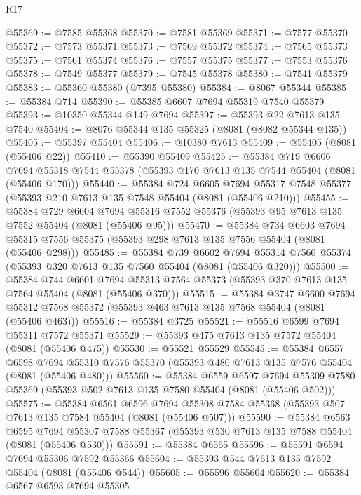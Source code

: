 \begin{lexlean}{R17}
\begin{coremodule}
@55369 := @7585 @55368
@55370 := @7581 @55369
@55371 := @7577 @55370
@55372 := @7573 @55371
@55373 := @7569 @55372
@55374 := @7565 @55373
@55375 := @7561 @55374
@55376 := @7557 @55375
@55377 := @7553 @55376
@55378 := @7549 @55377
@55379 := @7545 @55378
@55380 := @7541 @55379
@55383 := @55360 @55380 (@7395 @55380)
@55384 := @8067 @55344
@55385 := @55384 @714
@55390 := @55385 @6607 @7694 @55319 @7540 @55379
@55393 := @10350 @55344 @149 @7694
@55397 := @55393 @22 @7613 @135 @7540
@55404 := @8076 @55344 @135 @55325 (@8081 (@8082 @55344 @135))
@55405 := @55397 @55404
@55406 := @10380 @7613
@55409 := @55405 (@8081 (@55406 @22))
@55410 := @55390 @55409
@55425 := @55384
    @719
    @6606
    @7694
    @55318
    @7544
    @55378
    (@55393 @170 @7613 @135 @7544 @55404 (@8081 (@55406 @170)))
@55440 := @55384
    @724
    @6605
    @7694
    @55317
    @7548
    @55377
    (@55393 @210 @7613 @135 @7548 @55404 (@8081 (@55406 @210)))
@55455 := @55384
    @729
    @6604
    @7694
    @55316
    @7552
    @55376
    (@55393 @95 @7613 @135 @7552 @55404 (@8081 (@55406 @95)))
@55470 := @55384
    @734
    @6603
    @7694
    @55315
    @7556
    @55375
    (@55393 @298 @7613 @135 @7556 @55404 (@8081 (@55406 @298)))
@55485 := @55384
    @739
    @6602
    @7694
    @55314
    @7560
    @55374
    (@55393 @320 @7613 @135 @7560 @55404 (@8081 (@55406 @320)))
@55500 := @55384
    @744
    @6601
    @7694
    @55313
    @7564
    @55373
    (@55393 @370 @7613 @135 @7564 @55404 (@8081 (@55406 @370)))
@55515 := @55384
    @3747
    @6600
    @7694
    @55312
    @7568
    @55372
    (@55393 @463 @7613 @135 @7568 @55404 (@8081 (@55406 @463)))
@55516 := @55384 @3725
@55521 := @55516 @6599 @7694 @55311 @7572 @55371
@55529 := @55393 @475 @7613 @135 @7572 @55404 (@8081 (@55406 @475))
@55530 := @55521 @55529
@55545 := @55384
    @6557
    @6598
    @7694
    @55310
    @7576
    @55370
    (@55393 @480 @7613 @135 @7576 @55404 (@8081 (@55406 @480)))
@55560 := @55384
    @6559
    @6597
    @7694
    @55309
    @7580
    @55369
    (@55393 @502 @7613 @135 @7580 @55404 (@8081 (@55406 @502)))
@55575 := @55384
    @6561
    @6596
    @7694
    @55308
    @7584
    @55368
    (@55393 @507 @7613 @135 @7584 @55404 (@8081 (@55406 @507)))
@55590 := @55384
    @6563
    @6595
    @7694
    @55307
    @7588
    @55367
    (@55393 @530 @7613 @135 @7588 @55404 (@8081 (@55406 @530)))
@55591 := @55384 @6565
@55596 := @55591 @6594 @7694 @55306 @7592 @55366
@55604 := @55393 @544 @7613 @135 @7592 @55404 (@8081 (@55406 @544))
@55605 := @55596 @55604
@55620 := @55384
    @6567
    @6593
    @7694
    @55305

\end{coremodule}
\end{lexlean}
